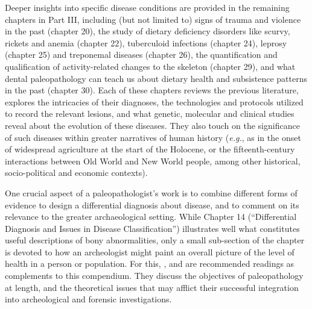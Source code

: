 Deeper insights into specific disease conditions are provided in the remaining chapters in Part III, including (but not limited to) signs of trauma and violence in the past (chapter 20), the study of dietary deficiency disorders like scurvy, rickets and anemia (chapter 22), tuberculoid infections (chapter 24), leprosy (chapter 25) and treponemal diseases (chapter 26), the quantification and qualification of activity-related changes to the skeleton (chapter 29), and what dental paleopathology can teach us about dietary health and subsistence patterns in the past (chapter 30).
Each of these chapters reviews the previous literature, explores the intricacies of their diagnoses, the technologies and protocols utilized to record the relevant lesions, and what genetic, molecular and clinical studies reveal about the evolution of these diseases.
They also touch on the significance of such diseases within greater narratives of human history (\textit{e.g.}, as in the onset of widespread agriculture at the start of the Holocene, or the fifteenth-century interactions between Old World and New World people, among other historical, socio-political and economic contexts).

One crucial aspect of a paleopathologist’s work is to combine different forms of evidence to design a differential diagnosis about disease, and to comment on its relevance to the greater archaeological setting.
While Chapter 14 (“Differential Diagnosis and Issues in Disease Classification”) illustrates well what constitutes useful descriptions of bony abnormalities, only a small sub-section of the chapter is devoted to how an archeologist might paint an overall picture of the level of health in a person or population.
For this, \textcite{Waldron1994}, \textcite{Robb2000} and \textcites{Ortner2003b}{Ortner2003c}{Ortner2011} are recommended readings as complements to this compendium. They discuss the objectives of paleopathology at length, and the theoretical issues that may afflict their successful integration into archeological and forensic investigations.

